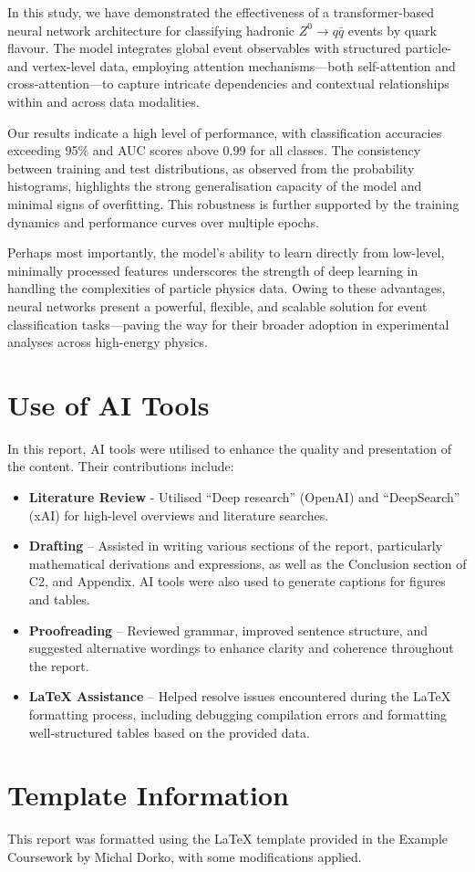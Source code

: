 \documentclass[11pt]{article}
\begin{document}
In this study, we have demonstrated the effectiveness of a transformer-based neural network architecture for classifying hadronic \( Z^0 \rightarrow q\bar{q} \) events by quark flavour. The model integrates global event observables with structured particle- and vertex-level data, employing attention mechanisms—both self-attention and cross-attention—to capture intricate dependencies and contextual relationships within and across data modalities.

Our results indicate a high level of performance, with classification accuracies exceeding 95\% and AUC scores above 0.99 for all classes. The consistency between training and test distributions, as observed from the probability histograms, highlights the strong generalisation capacity of the model and minimal signs of overfitting. This robustness is further supported by the training dynamics and performance curves over multiple epochs.

Perhaps most importantly, the model’s ability to learn directly from low-level, minimally processed features underscores the strength of deep learning in handling the complexities of particle physics data. Owing to these advantages, neural networks present a powerful, flexible, and scalable solution for event classification tasks—paving the way for their broader adoption in experimental analyses across high-energy physics.



\clearpage
\newpage
\appendix
\section{Use of AI Tools}
In this report, AI tools were utilised to enhance the quality and presentation of the content. Their contributions include:

\begin{itemize}
    \item \textbf{Literature Review} - Utilised “Deep research” (OpenAI) and “DeepSearch” (xAI) for high-level overviews and literature searches.
    
    \item \textbf{Drafting} – Assisted in writing various sections of the report, particularly mathematical derivations and expressions, as well as the Conclusion section of C2, and Appendix. AI tools were also used to generate captions for figures and tables.
    
    \item \textbf{Proofreading} – Reviewed grammar, improved sentence structure, and suggested alternative wordings to enhance clarity and coherence throughout the report.
    
    \item \textbf{LaTeX Assistance} – Helped resolve issues encountered during the LaTeX formatting process, including debugging compilation errors and formatting well-structured tables based on the provided data.
\end{itemize}



\section{Template Information}
This report was formatted using the LaTeX template provided in the Example Coursework by Michal Dorko, with some modifications applied.


\newpage
\printbibliography
\end{document}
